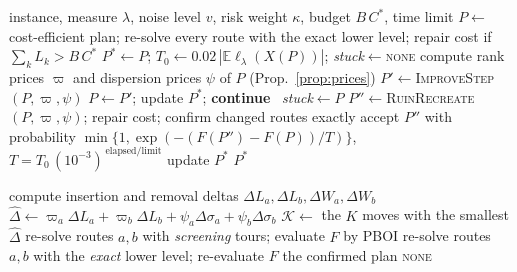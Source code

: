 \documentclass[11pt]{article}
\theoremstyle{definition}
\newcommand{\E}{\mathbb{E}}
\newcommand{\lord}{\ell_\lambda}
\begin{document}
\begin{algorithm}[t]
\caption{SORTIE: main loop}\label{alg:sortie}
\begin{algorithmic}[1]
\Require instance, measure $\lambda$, noise level $v$, risk weight $\kappa$, budget $B\,C^\ast$, time limit
\State $P\gets$ cost-efficient plan; re-solve every route with the exact lower level; repair cost if $\sum_kL_k>B\,C^\ast$
\State $P^\ast\gets P$; $T_0\gets0.02\,|\E\lord(X(P))|$; \textit{stuck}$\gets$\textsc{none}
  \State compute rank prices $\varpi$ and dispersion prices $\psi$ of $P$ (Prop.~\ref{prop:prices})
    \State $P'\gets$\textsc{ImproveStep}$(P,\varpi,\psi)$ 
     $P\gets P'$; update $P^\ast$; \textbf{continue}
    \Else\ \textit{stuck}$\gets P$
    \EndIf
  \EndIf
  \State $P''\gets$\textsc{RuinRecreate}$(P,\varpi,\psi)$; repair cost; confirm changed routes exactly
  \State accept $P''$ with probability $\min\{1,\exp(-(F(P'')-F(P))/T)\}$, $T=T_0\,(10^{-3})^{\,\text{elapsed}/\text{limit}}$
  \State update $P^\ast$
\EndWhile
\State \Return $P^\ast$
\end{algorithmic}
\end{algorithm}

\begin{algorithm}[t]
\caption{\textsc{ImproveStep}$(P,\varpi,\psi)$: screen, evaluate, confirm}\label{alg:improve}
\begin{algorithmic}[1]
  \State compute insertion and removal deltas $\Delta L_a,\Delta L_b,\Delta W_a,\Delta W_b$
    \State $\hat\Delta\gets\varpi_a\Delta L_a+\varpi_b\Delta L_b+\psi_a\Delta\sigma_a+\psi_b\Delta\sigma_b$ 
  \EndIf
\EndFor
\State $\mathcal K\gets$ the $K$ moves with the smallest $\hat\Delta$
 \State re-solve routes $a,b$ with \emph{screening} tours; evaluate $F$ by PBOI \EndFor
{}
  \State re-solve routes $a,b$ with the \emph{exact} lower level; re-evaluate $F$
   \Return the confirmed plan \EndIf
\EndFor
\State \Return \textsc{none}
\end{algorithmic}
\end{algorithm}
\end{document}
